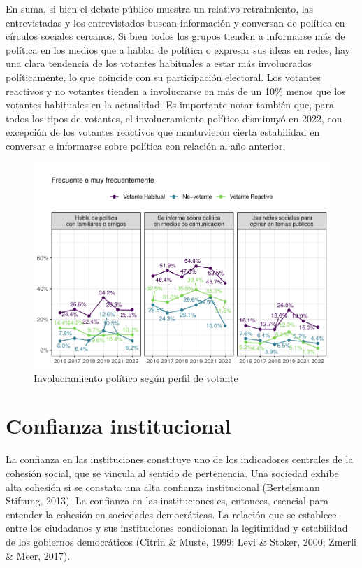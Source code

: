\documentclass[
  12pt,
]{book}
\begin{document}
En suma, si bien el debate público muestra un relativo retraimiento, las entrevistadas y los entrevistados buscan información y conversan de política en círculos sociales cercanos. Si bien todos los grupos tienden a informarse más de política en los medios que a hablar de política o expresar sus ideas en redes, hay una clara tendencia de los votantes habituales a estar más involucrados políticamente, lo que coincide con su participación electoral. Los votantes reactivos y no votantes tienden a involucrarse en más de un 10\% menos que los votantes habituales en la actualidad. Es importante notar también que, para todos los tipos de votantes, el involucramiento político disminuyó en 2022, con excepción de los votantes reactivos que mantuvieron cierta estabilidad en conversar e informarse sobre política con relación al año anterior.

\begin{figure}

{\centering \includegraphics{reporte-elsoc_files/figure-latex/graf-involv-poli-2-1} 

}

\caption{Involucramiento político según perfil de votante}\label{fig:graf-involv-poli-2}
\end{figure}

\hypertarget{confianza-institucional}{%
\section{Confianza institucional}\label{confianza-institucional}}

La confianza en las instituciones constituye uno de los indicadores centrales de la cohesión social, que se vincula al sentido de pertenencia. Una sociedad exhibe alta cohesión si se constata una alta confianza institucional (Bertelsmann Stiftung, 2013). La confianza en las instituciones es, entonces, esencial para entender la cohesión en sociedades democráticas. La relación que se establece entre los ciudadanos y sus instituciones condicionan la legitimidad y estabilidad de los gobiernos democráticos (Citrin \& Muste, 1999; Levi \& Stoker, 2000; Zmerli \& Meer, 2017).
\end{document}
